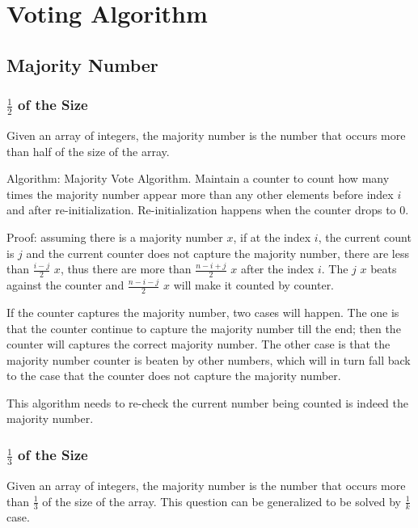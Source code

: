\section{Voting Algorithm}
\subsection{Majority Number}
\subsubsection{$\frac{1}{2}$ of the Size}
Given an array of integers, the majority number is the number that occurs more than half of the size of the array. 

Algorithm: Majority Vote Algorithm. Maintain a counter to count how many times the majority number appear more than any other elements before index $i$ and after re-initialization. Re-initialization happens when the counter drops to 0. 

Proof: assuming there is a majority number $x$, if at the index $i$, the current count is $j$ and the current counter does not capture the majority number, there are less than $\frac{i-j}{2}$ $x$, thus there are more than $\frac{n-i+j}{2}$ $x$ after the index $i$. The $j$ $x$ beats against the counter and $\frac{n-i-j}{2}$ $x$ will make it counted by counter. 

If the counter captures the majority number, two cases will happen. The one is that the counter continue to capture the majority number till the end; then the counter will captures the correct majority number. The other case is that the majority number counter is beaten by other numbers, which will in turn fall back to the case that the counter does not capture the majority number.
 
This algorithm needs to re-check the current number being counted is indeed the majority number.    

\subsubsection{$\frac{1}{3}$ of the Size}
Given an array of integers, the majority number is the number that occurs more than $\frac{1}{3}$ of the size of the array. This question can be generalized to be solved by $\frac{1}{k}$ case. 

